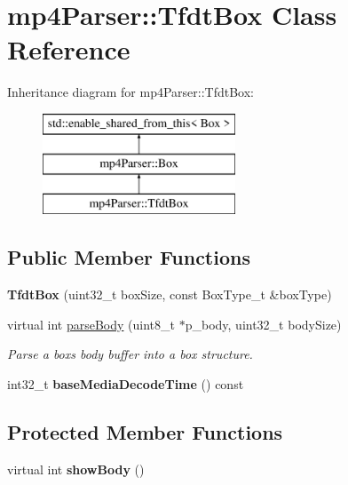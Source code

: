 \hypertarget{classmp4_parser_1_1_tfdt_box}{}\section{mp4\+Parser\+::Tfdt\+Box Class Reference}
\label{classmp4_parser_1_1_tfdt_box}
Inheritance diagram for mp4\+Parser\+::Tfdt\+Box\+:\begin{figure}[H]
\begin{center}
\leavevmode
\includegraphics[height=3.000000cm]{classmp4_parser_1_1_tfdt_box}
\end{center}
\end{figure}
\subsection*{Public Member Functions}
\begin{DoxyCompactItemize}
\item 
\mbox{\label{classmp4_parser_1_1_tfdt_box_afd36763866ebdd49c41f63885afdad5f}} 
{\bfseries Tfdt\+Box} (uint32\+\_\+t box\+Size, const Box\+Type\+\_\+t \&box\+Type)
\item 
virtual int \mbox{\hyperlink{classmp4_parser_1_1_tfdt_box_ae73900672f8fe353a6fee9a37b971ad4}{parse\+Body}} (uint8\+\_\+t $\ast$p\+\_\+body, uint32\+\_\+t body\+Size)
\begin{DoxyCompactList}\small\item\em Parse a box\textquotesingle{}s body buffer into a box structure. \end{DoxyCompactList}\item 
\mbox{\label{classmp4_parser_1_1_tfdt_box_a7e185c74ad8d2f9cf35b02471fcef9cb}} 
int32\+\_\+t {\bfseries base\+Media\+Decode\+Time} () const
\end{DoxyCompactItemize}
\subsection*{Protected Member Functions}
\begin{DoxyCompactItemize}
\item 
\mbox{\label{classmp4_parser_1_1_tfdt_box_a8c3e63e056fb8e7595be74a4ba1f417a}} 
virtual int {\bfseries show\+Body} ()
\end{DoxyCompactItemize}
